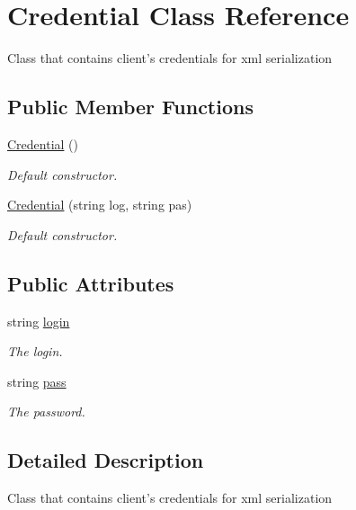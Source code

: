 \hypertarget{class_credential}{\section{Credential Class Reference}
\label{class_credential}
}


Class that contains client's credentials for xml serialization 


\subsection*{Public Member Functions}
\begin{DoxyCompactItemize}
\item 
\hyperlink{class_credential_a741b7ba81517054abdbfdb4b4e14e7f3}{Credential} ()
\begin{DoxyCompactList}\small\item\em Default constructor.\end{DoxyCompactList}\item 
\hyperlink{class_credential_a39f93c51b56fcfbe43ed960c35a3aa49}{Credential} (string log, string pas)
\begin{DoxyCompactList}\small\item\em Default constructor.\end{DoxyCompactList}\end{DoxyCompactItemize}
\subsection*{Public Attributes}
\begin{DoxyCompactItemize}
\item 
string \hyperlink{class_credential_a02df5e22bfa74fd15d659a357fd5620e}{login}
\begin{DoxyCompactList}\small\item\em The login.\end{DoxyCompactList}\item 
string \hyperlink{class_credential_a2f780285fb518f1826543a0f10f0e29f}{pass}
\begin{DoxyCompactList}\small\item\em The password.\end{DoxyCompactList}\end{DoxyCompactItemize}


\subsection{Detailed Description}
Class that contains client's credentials for xml serialization



